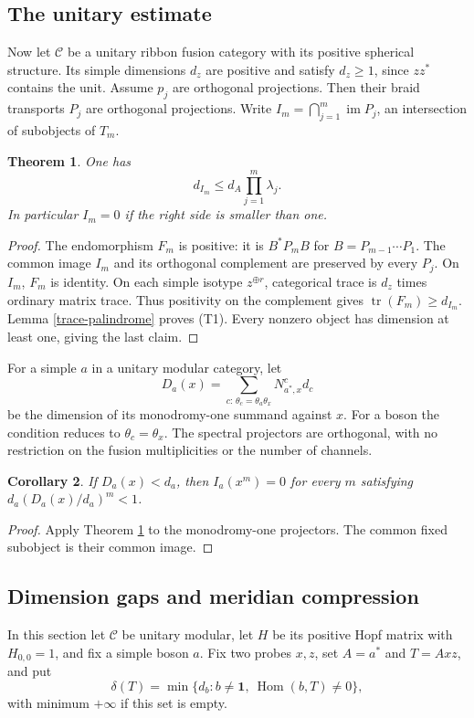 \documentclass[10pt]{amsart}
\newcommand{\one}{\mathbf1}\newcommand{\C}{\mathcal C}
\newcommand{\Hom}{\operatorname{Hom}}\newcommand{\Irr}{\operatorname{Irr}}
\newcommand{\tr}{\operatorname{tr}}\newcommand{\ptr}{\operatorname{ptr}}
\newcommand{\im}{\operatorname{im}}
\newtheorem{theorem}{Theorem}[section]
\newtheorem{corollary}[theorem]{Corollary}
\begin{document}
\subsection{The unitary estimate}
Now let $\C$ be a unitary ribbon fusion category with its positive
spherical structure. Its simple dimensions $d_z$ are positive and
satisfy $d_z\ge1$, since $z z^*$ contains the unit.
Assume $p_j$ are orthogonal projections. Then their braid transports
$P_j$ are orthogonal projections. Write
$I_m=\bigcap_{j=1}^m\im P_j$, an intersection of subobjects of $T_m$.

\begin{theorem}\label{trace-bound}
One has
\[
                    d_{I_m}\le d_A\prod_{j=1}^m\lambda_j.    \tag{T1}
\]
In particular $I_m=0$ if the right side is smaller than one.
\end{theorem}
\begin{proof}
The endomorphism $F_m$ is positive: it is $B^*P_mB$ for
$B=P_{m-1}\cdots P_1$. The common image $I_m$ and its orthogonal
complement are preserved by every $P_j$. On $I_m$, $F_m$ is identity.
On each simple isotype $z^{\oplus r}$, categorical trace is $d_z$
times ordinary matrix trace. Thus positivity on the complement
gives $\tr(F_m)\ge d_{I_m}$. Lemma \ref{trace-palindrome} proves (T1).
Every nonzero object has dimension at least one, giving the last claim.
\end{proof}


For a simple $a$ in a unitary modular category, let
\[
 D_a(x)=\sum_{c:\,\theta_c=\theta_a\theta_x}N_{a^*,x}^c d_c
\]
be the dimension of its monodromy-one summand against $x$.
For a boson the condition reduces to $\theta_c=\theta_x$.
The spectral projectors are orthogonal, with no restriction
on the fusion multiplicities or the number of channels.

\begin{corollary}\label{repeat-detect}
If $D_a(x)<d_a$, then $I_a(x^m)=0$ for every $m$ satisfying
$d_a(D_a(x)/d_a)^m<1$.
\end{corollary}
\begin{proof}
Apply Theorem \ref{trace-bound} to the monodromy-one
projectors. The common fixed subobject is their common image.
\end{proof}


\subsection{Dimension gaps and meridian compression}
In this section let $\C$ be unitary modular, let $H$ be its positive Hopf matrix with $H_{0,0}=1$, and fix a simple boson $a$. Fix two probes $x,z$, set $A=a^*$ and $T=Axz$, and put
\[
 \delta(T)=\min\{d_b:b\ne\one,\ \Hom(b,T)\ne0\},
\]
with minimum $+\infty$ if this set is empty.
\end{document}

